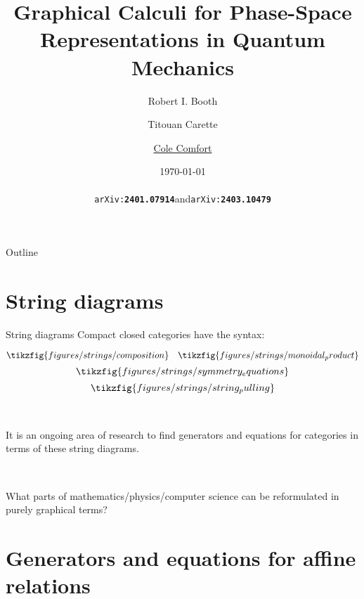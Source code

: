 \documentclass{beamer}
\title[]{Graphical Calculi for Phase-Space Representations in Quantum Mechanics}
\author[]
{Robert I. Booth\inst{1,2} \and Titouan Carette\inst{3} \and \underline{Cole Comfort} \inst{4}}
\institute%
{
  \inst{1}%
  University of Edinburgh, United Kingdom
  \and
  \inst{2}%
  University of Bristol, United Kingdom
  \and
  \inst{3}%
  LIX, CNRS, École polytechnique, Institut Polytechnique de Paris, 91120, Palaiseau, France
  \and
  \inst{4}%
  Universit\'e de Lorraine, CNRS, Inria, LORIA, F 54000 Nancy, France
  }
\date%
{\today \\ \ \\ \texttt{arXiv:\textbf{2401.07914}}\quad and\quad \texttt{arXiv:\textbf{2403.10479}}}
\begin{document}
\nocite{gauss,gsa,weedbrook_gaussian_2012}

\begin{frame}
  \titlepage
\end{frame}

 \begin{frame}{Outline}
    \tableofcontents
  \end{frame}
  
  
\section{String diagrams}

\begin{frame}{String diagrams}
Compact closed categories have the syntax:

\[
  \tikzfig{figures/strings/composition}
  \quad
  \tikzfig{figures/strings/monoidal_product}
\]
\[
  \tikzfig{figures/strings/symmetry_equations}
\]
\[
 \tikzfig{figures/strings/string_pulling}
\]

\ 

It is an ongoing area of research to find generators and equations for categories in terms of these string diagrams.

\

What parts of mathematics/physics/computer science can be reformulated in purely graphical terms?
\end{frame}

\section{Generators and equations for affine relations}
\end{document}
